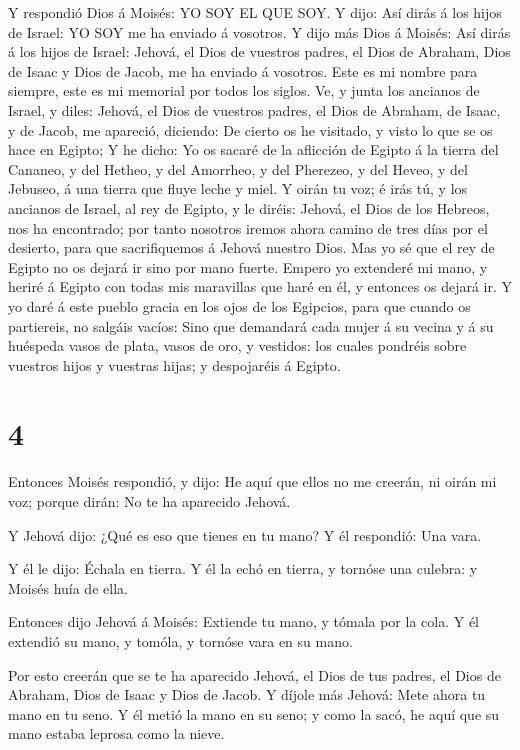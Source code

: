  Y respondió Dios á Moisés: YO SOY EL QUE SOY. Y dijo: Así
dirás á los hijos de Israel: YO SOY me ha enviado á vosotros.
 Y dijo más Dios á Moisés: Así dirás á los hijos de Israel:
Jehová, el Dios de vuestros padres, el Dios de Abraham, Dios de Isaac y
Dios de Jacob, me ha enviado á vosotros. Este es mi nombre para siempre,
este es mi memorial por todos los siglos.  Ve, y junta los
ancianos de Israel, y diles: Jehová, el Dios de vuestros padres, el Dios
de Abraham, de Isaac, y de Jacob, me apareció, diciendo: De cierto os he
visitado, y visto lo que se os hace en Egipto;  Y he dicho:
Yo os sacaré de la aflicción de Egipto á la tierra del Cananeo, y del
Hetheo, y del Amorrheo, y del Pherezeo, y del Heveo, y del Jebuseo, á
una tierra que fluye leche y miel.  Y oirán tu voz; é irás
tú, y los ancianos de Israel, al rey de Egipto, y le diréis: Jehová, el
Dios de los Hebreos, nos ha encontrado; por tanto nosotros iremos ahora
camino de tres días por el desierto, para que sacrifiquemos á Jehová
nuestro Dios.  Mas yo sé que el rey de Egipto no os dejará
ir sino por mano fuerte.  Empero yo extenderé mi mano, y
heriré á Egipto con todas mis maravillas que haré en él, y entonces os
dejará ir.  Y yo daré á este pueblo gracia en los ojos de
los Egipcios, para que cuando os partiereis, no salgáis vacíos:
 Sino que demandará cada mujer á su vecina y á su huéspeda
vasos de plata, vasos de oro, y vestidos: los cuales pondréis sobre
vuestros hijos y vuestras hijas; y despojaréis á Egipto.

\hypertarget{section-3}{%
\section{4}\label{section-3}}

 Entonces Moisés respondió, y dijo: He aquí que ellos no me
creerán, ni oirán mi voz; porque dirán: No te ha aparecido Jehová.

 Y Jehová dijo: ¿Qué es eso que tienes en tu mano? Y él
respondió: Una vara.

 Y él le dijo: Échala en tierra. Y él la echó en tierra, y
tornóse una culebra: y Moisés huía de ella.

 Entonces dijo Jehová á Moisés: Extiende tu mano, y tómala
por la cola. Y él extendió su mano, y tomóla, y tornóse vara en su mano.

 Por esto creerán que se te ha aparecido Jehová, el Dios de
tus padres, el Dios de Abraham, Dios de Isaac y Dios de Jacob.
 Y díjole más Jehová: Mete ahora tu mano en tu seno. Y él
metió la mano en su seno; y como la sacó, he aquí que su mano estaba
leprosa como la nieve.

